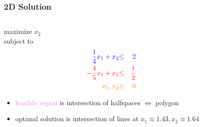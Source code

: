 \documentclass[10pt,aspectratio=169]{beamer}
\begin{document}
\begin{frame} \frametitle{2D Solution}
  \begin{columns}
    \begin{column}{0.4 \textwidth}
  maximize $x_2$ \\
  subject to
  \begin{eqnarray*}
    \textcolor{blue}{\frac{1}{4} x_1 + x_2} &\textcolor{blue}{\leq}& \textcolor{blue}{2} \\
    \textcolor{red}{-\frac{4}{5} x_1 + x_2} &\textcolor{red}{\leq}& \textcolor{red}{\frac{1}{2}} \\
    \textcolor{orange}{x_1, x_2} &\textcolor{orange}{\geq}& \textcolor{orange}{0}
  \end{eqnarray*}
  \begin{itemize}
    \item \textcolor{violet}{feasible region} is intersection of halfspaces
     $\Leftrightarrow$ polygon
    \item optimal solution is intersection of lines
      at $x_1 \approx 1.43, x_2 \approx 1.64$
  \end{itemize}
  \end{column}
  \begin{column}{0.6 \textwidth}
    \begin{center}
  \end{center}
\end{column}
\end{columns}
\end{frame}
\end{document}
